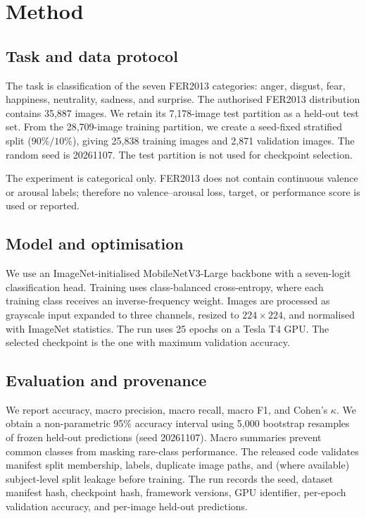 \documentclass[10pt,conference]{IEEEtran}
\begin{document}
\section{Method}
\subsection{Task and data protocol}
The task is classification of the seven FER2013 categories: anger, disgust, fear, happiness, neutrality, sadness, and surprise. The authorised FER2013 distribution contains 35,887 images. We retain its 7,178-image test partition as a held-out test set. From the 28,709-image training partition, we create a seed-fixed stratified split ($90\%/10\%$), giving 25,838 training images and 2,871 validation images. The random seed is 20261107. The test partition is not used for checkpoint selection.

The experiment is categorical only. FER2013 does not contain continuous valence or arousal labels; therefore no valence--arousal loss, target, or performance score is used or reported.

\subsection{Model and optimisation}
We use an ImageNet-initialised MobileNetV3-Large backbone \cite{howard2019searching} with a seven-logit classification head. Training uses class-balanced cross-entropy, where each training class receives an inverse-frequency weight. Images are processed as grayscale input expanded to three channels, resized to $224\times224$, and normalised with ImageNet statistics. The run uses 25 epochs on a Tesla T4 GPU. The selected checkpoint is the one with maximum validation accuracy.

\subsection{Evaluation and provenance}
We report accuracy, macro precision, macro recall, macro F1, and Cohen's $\kappa$. We obtain a non-parametric 95\% accuracy interval using 5,000 bootstrap resamples of frozen held-out predictions (seed 20261107). Macro summaries prevent common classes from masking rare-class performance. The released code validates manifest split membership, labels, duplicate image paths, and (where available) subject-level split leakage before training. The run records the seed, dataset manifest hash, checkpoint hash, framework versions, GPU identifier, per-epoch validation accuracy, and per-image held-out predictions.
\end{document}
